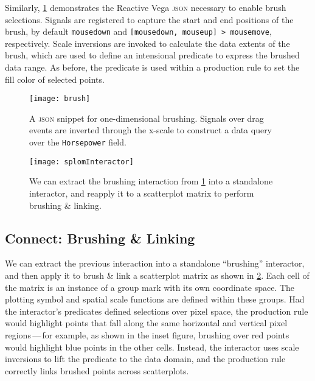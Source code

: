 Similarly, \cref{fig:vg:brush} demonstrates the Reactive Vega \textsc{json}
necessary to enable brush selections. Signals are registered to capture the
start and end positions of the brush, by default \texttt{mousedown} and
\texttt{[mousedown, mouseup] > mousemove}, respectively. Scale inversions are
invoked to calculate the data extents of the brush, which are used to define an
intensional predicate to express the brushed data range. As before, the
predicate is used within a production rule to set the fill color of selected
points.

\begin{figure}[h!]
  \centering
  \texttt{[image: brush]}
  \caption{A \textsc{json} snippet for one-dimensional brushing. Signals over
  drag events are inverted through the x-scale to construct a data query over
  the \texttt{Horsepower} field.}
  \label{fig:vg:brush}
\end{figure}

\begin{figure}[h!]
  \centering
  \texttt{[image: splomInteractor]}
  \caption{We can extract the brushing interaction from \cref{fig:vg:brush}
  into a standalone interactor, and reapply it to a scatterplot matrix to
  perform brushing \& linking.}
  \label{fig:vg:splomInteractor}
\end{figure}

\subsection{Connect: Brushing \& Linking}

\vspace{-7pt}


We can extract the previous interaction into a standalone ``brushing''
interactor, and then apply it to brush \& link a scatterplot matrix as shown in
\cref{fig:vg:splomInteractor}. Each cell of the matrix is an instance of a group
mark with its own coordinate space. The plotting symbol and spatial scale
functions are defined within these groups. Had the interactor's predicates
defined selections over pixel space, the production rule would highlight points
that fall along the same horizontal and vertical pixel regions\,---\,for
example, as shown in the inset figure, brushing over red points would highlight
blue points in the other cells. Instead, the interactor uses scale inversions to
lift the predicate to the data domain, and the production rule correctly links
brushed points across scatterplots.

